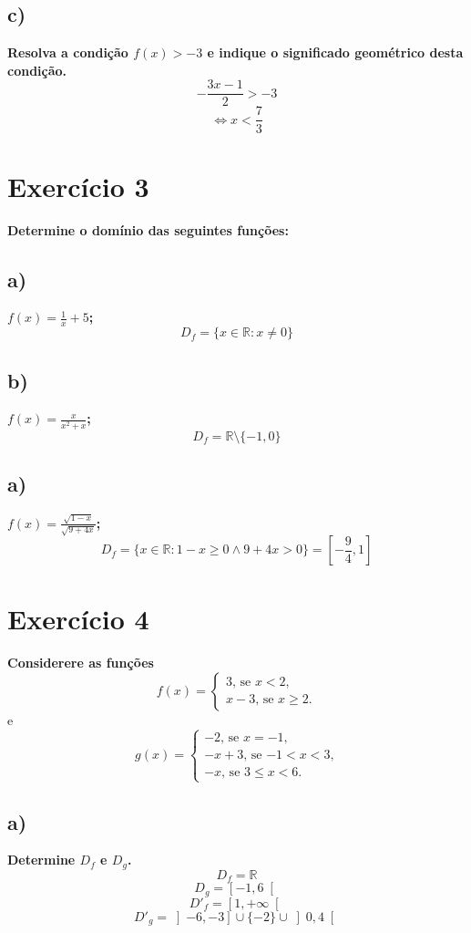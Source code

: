 \documentclass[a4paper]{article}
\begin{document}
\subsection*{c)}
\textbf{Resolva a condição $f(x)>-3$ e indique o significado geométrico desta condição.}
\[-\frac{3x-1}{2}>-3\]
\[\Leftrightarrow x < \frac{7}{3}\]
\section*{Exercício 3}\textbf{Determine o domínio das seguintes funções:}
\subsection*{a)}
\textbf{$f(x)=\frac{1}{x}+5$;}
\[D_{f}=\{x \in \mathbb{R}: x \neq 0\}\]

\subsection*{b)}
\textbf{$f(x)=\frac{x}{x^2+x}$;}
\[D_{f}=\mathbb{R}\setminus \{-1,0\}\]

\subsection*{a)}
\textbf{$f(x)=\frac{\sqrt{1-x}}{\sqrt{9+4x}}$;}
\[D_{f}=\{x \in \mathbb{R}: 1-x \geq 0 \land  9+4x > 0 \}=\left[-\frac{9}{4},1\right]\]

	\section*{Exercício 4}\textbf{Considerere as funções}
\[f(x)=\begin{cases}
	\text{$3$, se $x < 2$,}\\ 
	\text{$x-3$, se $x \geq 2$.}
\end{cases}\] 
e
\[g(x)=\begin{cases}
	\text{$-2$, se $x=-1$,}\\ 
	\text{$-x+3$, se $-1 < x < 3$,}\\
	\text{$-x$, se $3 \leq x < 6$.}
\end{cases}\]

\subsection*{a)}
\textbf{Determine $D_{f}$ e $D_{g}$.}
\[D_{f}=\mathbb{R}\]
\[D_{g}=\left[-1,6\right[\]
\[D'_{f}=\left[1,+\infty\right[\]
\[D'_{g}=\left]-6,-3\right] \cup \{-2\} \cup \left]0,4\right[\]
\end{document}
